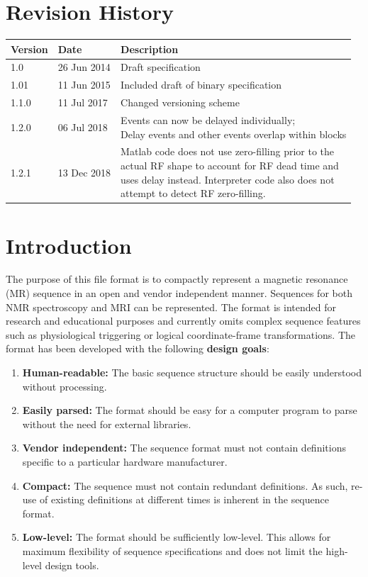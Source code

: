 \documentclass{article}
\begin{document}
\section*{Revision History}
\begin{tabular}{lll}
\toprule
Version & Date & Description \\
\midrule
1.0 & 26 Jun 2014 & Draft specification \\
1.01 & 11 Jun 2015 & Included draft of binary specification \\
1.1.0 & 11 Jul 2017 & Changed versioning scheme \\
1.2.0 & 06 Jul 2018 & \makecell{Events can now be delayed individually; \\ Delay events and other events overlap within blocks} \\
1.2.1 & 13 Dec 2018 & \makecell{Matlab code does not use zero-filling prior to the \\ actual RF shape to account for RF dead time and \\ uses delay instead. Interpreter code also does not \\ attempt to detect RF zero-filling.} \\
\bottomrule
\end{tabular}


\section{Introduction}
The purpose of this file format is to compactly represent a magnetic resonance (MR) sequence in an open and vendor independent manner. Sequences for both NMR spectroscopy and MRI can be represented. The format is intended for research and educational purposes and currently omits complex sequence features such as physiological triggering or logical coordinate-frame transformations. The format has been developed with the following \textbf{design goals}:
\begin{enumerate}
\item \textbf{Human-readable:} The basic sequence structure should be easily understood without processing.
\item \textbf{Easily parsed:} The format should be easy for a computer program to parse without the need for external libraries.
\item \textbf{Vendor independent:} The sequence format must not contain definitions specific to a particular hardware manufacturer.
\item \textbf{Compact:} The sequence must not contain redundant definitions. As such, re-use of existing definitions at different times is inherent in the sequence format.
\item \textbf{Low-level:} The format should be sufficiently low-level. This allows for maximum flexibility of sequence specifications and does not limit the high-level design tools.
\end{enumerate}
\end{document}
